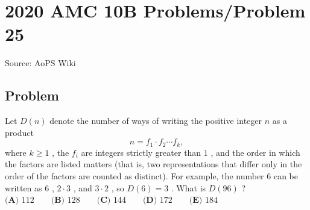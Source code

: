 \documentclass[12pt]{article}
\begin{document}
\section*{{2020 AMC 10B Problems/Problem 25}}
Source: AoPS Wiki

\subsection*{Problem}
Let $D(n)$ denote the number of ways of writing the positive integer $n$ as a product \[n = f_1\cdot f_2\cdots f_k,\] where $k\ge1$ , the $f_i$ are integers strictly greater than $1$ , and the order in which the factors are listed matters (that is, two representations that differ only in the order of the factors are counted as distinct). For example, the number $6$ can be written as $6$ , $2\cdot 3$ , and $3\cdot2$ , so $D(6) = 3$ . What is $D(96)$ ? $\textbf{(A) } 112 \qquad\textbf{(B) } 128 \qquad\textbf{(C) } 144 \qquad\textbf{(D) } 172 \qquad\textbf{(E) } 184$
\end{document}
